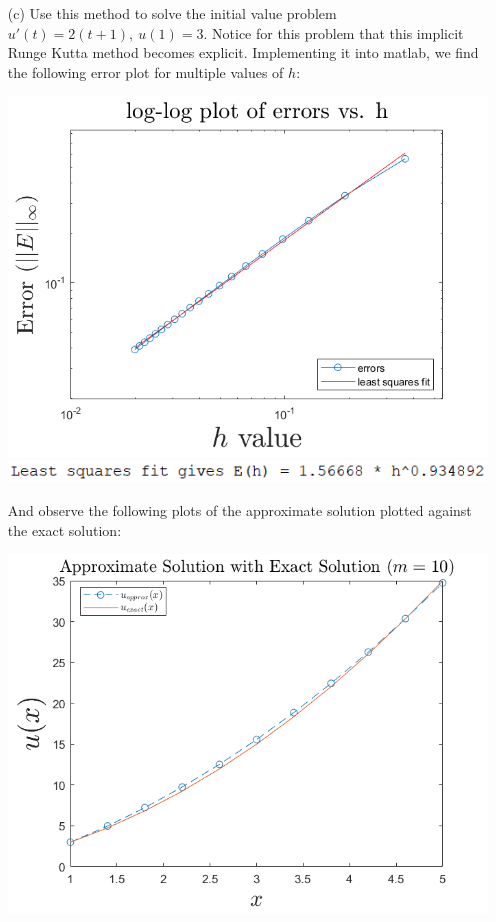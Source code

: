 \documentclass{article}
\begin{document}
\begin{enumerate}
    \item[(c)] Use this method to solve the initial value problem $u'(t) = 2(t + 1), \: u(1) = 3$.
    \newline\newline
    Notice for this problem that this implicit Runge Kutta method becomes explicit. Implementing it into matlab, we find the following error plot for multiple values of $h$:
    \begin{center}
        \includegraphics[scale = 0.5]{3cerr.png}
        \includegraphics[scale = 0.7]{3cleastsquares.PNG}
    \end{center}
    And observe the following plots of the approximate solution plotted against the exact solution:
    \begin{center}
        \includegraphics[scale = 0.4]{3cm10.png}

\end{center}
\end{enumerate}
\end{document}
